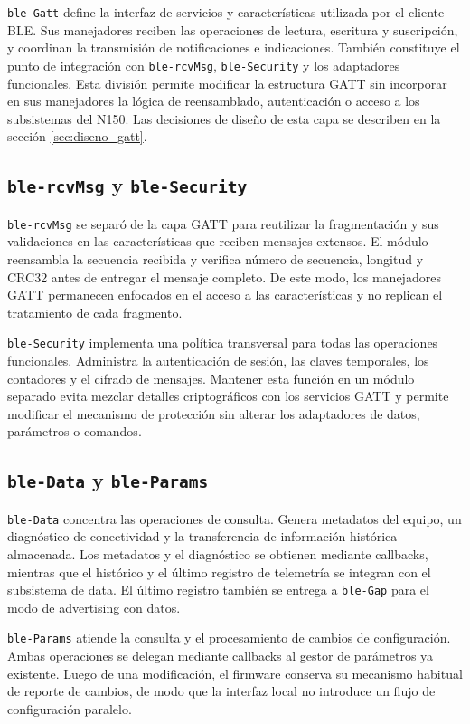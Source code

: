 \texttt{ble-Gatt} define la interfaz de servicios y características utilizada por el cliente BLE. Sus manejadores reciben las operaciones de lectura, escritura y suscripción, y coordinan la transmisión de notificaciones e indicaciones. También constituye el punto de integración con \texttt{ble-rcvMsg}, \texttt{ble-Security} y los adaptadores funcionales. Esta división permite modificar la estructura GATT sin incorporar en sus manejadores la lógica de reensamblado, autenticación o acceso a los subsistemas del N150. Las decisiones de diseño de esta capa se describen en la sección \ref{sec:diseno_gatt}.

\subsection{\texttt{ble-rcvMsg} y \texttt{ble-Security}}

\texttt{ble-rcvMsg} se separó de la capa GATT para reutilizar la fragmentación y sus validaciones en las características que reciben mensajes extensos. El módulo reensambla la secuencia recibida y verifica número de secuencia, longitud y CRC32 antes de entregar el mensaje completo. De este modo, los manejadores GATT permanecen enfocados en el acceso a las características y no replican el tratamiento de cada fragmento.

\texttt{ble-Security} implementa una política transversal para todas las operaciones funcionales. Administra la autenticación de sesión, las claves temporales, los contadores y el cifrado de mensajes. Mantener esta función en un módulo separado evita mezclar detalles criptográficos con los servicios GATT y permite modificar el mecanismo de protección sin alterar los adaptadores de datos, parámetros o comandos.

\subsection{\texttt{ble-Data} y \texttt{ble-Params}}

\texttt{ble-Data} concentra las operaciones de consulta. Genera metadatos del equipo, un diagnóstico de conectividad y la transferencia de información histórica almacenada. Los metadatos y el diagnóstico se obtienen mediante callbacks, mientras que el histórico y el último registro de telemetría se integran con el subsistema de data. El último registro también se entrega a \texttt{ble-Gap} para el modo de advertising con datos.

\texttt{ble-Params} atiende la consulta y el procesamiento de cambios de configuración. Ambas operaciones se delegan mediante callbacks al gestor de parámetros ya existente. Luego de una modificación, el firmware conserva su mecanismo habitual de reporte de cambios, de modo que la interfaz local no introduce un flujo de configuración paralelo.

